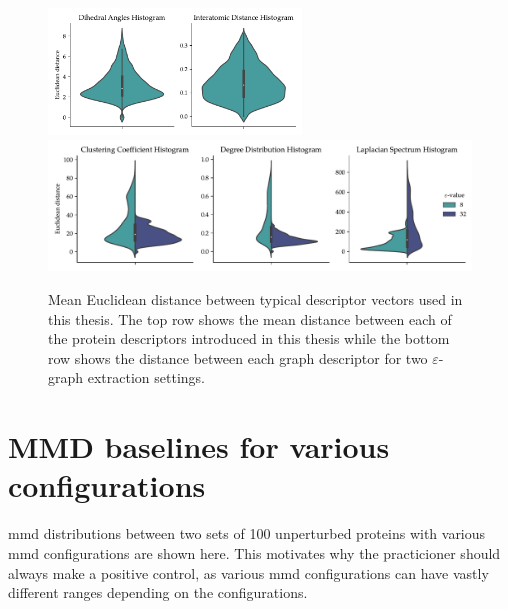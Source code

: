 \begin{figure}
  \centering
  \includegraphics[width=0.6\textwidth]{./figures/results/violin_protein_descriptors.pdf}
  \includegraphics[width=\textwidth]{./figures/results/violin_graph_descriptors.pdf}
  \caption[Mean Euclidean distance between typical descriptor vectors used in
  this thesis]{Mean Euclidean distance between typical descriptor vectors used in
this thesis. The top row shows the mean distance between each of the protein
descriptors introduced in this thesis while the bottom row shows the distance
between each graph descriptor for two $\varepsilon$-graph extraction settings.}
  \label{fig:mean_distance_embedding}
\end{figure}

\section{MMD baselines for various configurations}\label{sec:mmd_baselines}

\acrshort{mmd} distributions between two sets of 100 unperturbed proteins with
various \acrshort{mmd} configurations are shown here. This motivates why the
practicioner should always make a positive control, as various \acrshort{mmd}
configurations can have vastly different ranges depending on the configurations.

